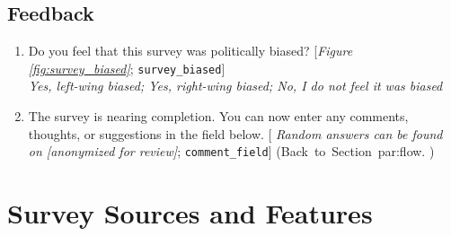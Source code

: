  \subsection*{Feedback} 
 \begin{enumerate}[resume] 
\item  \label{q:survey_biased} Do you feel that this survey was politically biased? [\textit{Figure \ref{fig:survey_biased}}; 
\verb|survey_biased|]
  \\ \textit{Yes, left-wing biased; Yes, right-wing biased; No, I do not feel it was biased}

\item  \label{q:comment_field} The survey is nearing completion. You can now enter any comments, thoughts, or suggestions in the field below. [%
\textit{Random answers can be found on [anonymized for review]}; %
\verb|comment_field|] \hfill (Back~to~Section~{par:flow}.%
 )



 \end{enumerate} 




\clearpage
{}
\section*{Survey Sources and Features}\label{app:features}



